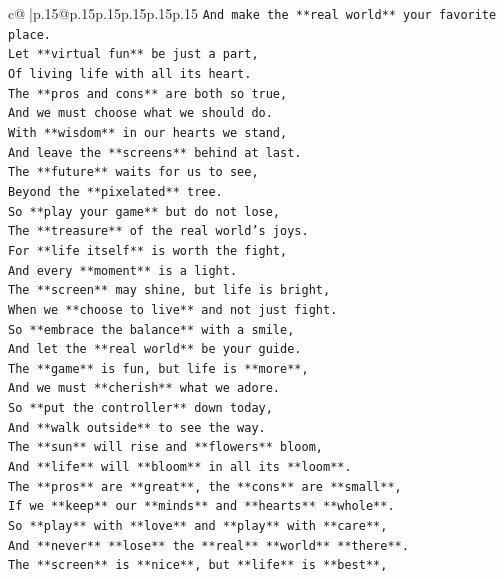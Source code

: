 \documentclass{article}
\begin{document}
{\begin{supertabular}{c@{$\;$}|p{.15\linewidth}@{}p{.15\linewidth}p{.15\linewidth}p{.15\linewidth}p{.15\linewidth}p{.15\linewidth}}
{{{\texttt{And make the **real world** your favorite place.} \\
\texttt{Let **virtual fun** be just a part,} \\
\texttt{Of living life with all its heart.} \\
\texttt{The **pros and cons** are both so true,} \\
\texttt{And we must choose what we should do.} \\
\texttt{With **wisdom** in our hearts we stand,} \\
\texttt{And leave the **screens** behind at last.} \\
\texttt{The **future** waits for us to see,} \\
\texttt{Beyond the **pixelated** tree.} \\
\texttt{So **play your game** but do not lose,} \\
\texttt{The **treasure** of the real world's joys.} \\
\texttt{For **life itself** is worth the fight,} \\
\texttt{And every **moment** is a light.} \\
\texttt{The **screen** may shine, but life is bright,} \\
\texttt{When we **choose to live** and not just fight.} \\
\texttt{So **embrace the balance** with a smile,} \\
\texttt{And let the **real world** be your guide.} \\
\texttt{The **game** is fun, but life is **more**,} \\
\texttt{And we must **cherish** what we adore.} \\
\texttt{So **put the controller** down today,} \\
\texttt{And **walk outside** to see the way.} \\
\texttt{The **sun** will rise and **flowers** bloom,} \\
\texttt{And **life** will **bloom** in all its **loom**.} \\
\texttt{The **pros** are **great**, the **cons** are **small**,} \\
\texttt{If we **keep** our **minds** and **hearts** **whole**.} \\
\texttt{So **play** with **love** and **play** with **care**,} \\
\texttt{And **never** **lose** the **real** **world** **there**.} \\
\texttt{The **screen** is **nice**, but **life** is **best**,} \\
}}}
\end{supertabular}}
\end{document}

